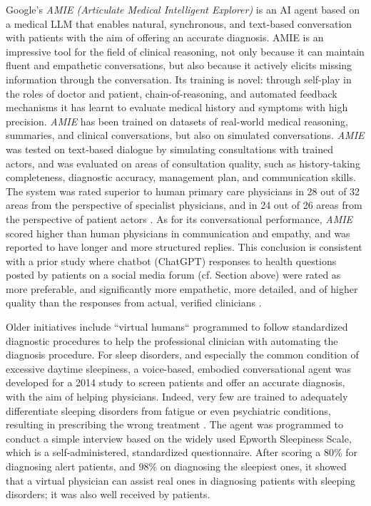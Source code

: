 Google's \textit{AMIE (Articulate Medical Intelligent Explorer)} is an AI agent based on a medical LLM that enables natural, synchronous, and text-based conversation with patients with the aim of offering an accurate diagnosis. AMIE is an impressive tool for the field of clinical reasoning, not only because it can maintain fluent and empathetic conversations, but also because it actively elicits missing information through the conversation.
Its training is novel: through self-play in the roles of doctor and patient, chain-of-reasoning, and automated feedback mechanisms it has learnt to evaluate medical history and symptoms with high precision. \textit{AMIE} has been trained on datasets of real-world medical reasoning, summaries, and clinical conversations, but also on simulated conversations.
\textit{AMIE} was tested on text-based dialogue by simulating consultations with trained actors, and was evaluated on areas of consultation quality, such as history-taking completeness, diagnostic accuracy, management plan, and communication skills. The system was rated superior to human primary care physicians in 28 out of 32 areas from the perspective of specialist physicians, and in 24 out of 26 areas from the perspective of patient actors \cite{AMIE2024}. As for its conversational performance, \textit{AMIE} scored higher than human physicians in communication and empathy, and was reported to have longer and more structured replies. This conclusion is consistent with a prior study where chatbot (ChatGPT) responses to health questions posted by patients on a social media forum (cf. Section above) were rated as more preferable, and significantly more empathetic, more detailed, and of higher quality than the responses from actual, verified clinicians \cite{ayersetall2023redditempathy}.

Older initiatives include ``virtual humans`` programmed to follow standardized diagnostic procedures to help the professional clinician with automating the diagnosis procedure. For sleep disorders, and especially the common condition of excessive daytime sleepiness, a voice-based, embodied conversational agent was developed for a 2014 study to screen patients and offer an accurate diagnosis, with the aim of helping physicians. Indeed, very few are trained to adequately differentiate sleeping disorders from fatigue or even psychiatric conditions, resulting in prescribing the wrong treatment \cite{eds2014}. The agent was programmed to conduct a simple interview based on the widely used Epworth Sleepiness Scale, which is a self-administered, standardized questionnaire. After scoring a 80\% for diagnosing alert patients, and 98\% on diagnosing the sleepiest ones, it showed that a virtual physician can assist real ones in diagnosing patients with sleeping disorders; it was also well received by patients.

